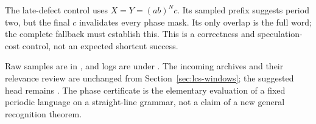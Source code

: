 The late-defect control uses $X=Y=(ab)^Nc$. Its sampled prefix suggests
period two, but the final $c$ invalidates every phase mask. Its only overlap
is the full word; the complete fallback must establish this. This is a
correctness and speculation-cost control, not an expected shortcut success.

Raw samples are in , and logs are
under . The incoming archives and their
relevance review are unchanged from Section~\ref{sec:lcs-windows}; the
suggested  head remains . The phase
certificate is the elementary evaluation of a fixed periodic language on
a straight-line grammar, not a claim of a new general recognition theorem.

